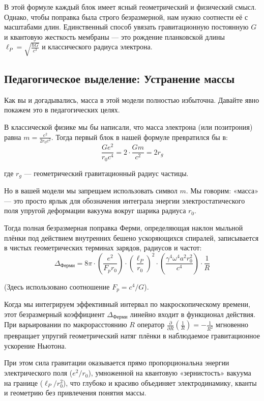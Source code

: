 \documentclass[12pt,a4paper]{article}
\begin{document}
В этой формуле каждый блок имеет ясный геометрический и физический смысл. Однако, чтобы поправка была строго безразмерной, нам нужно соотнести её с масштабами длин. Единственный способ увязать гравитационную постоянную $G$ и квантовую жесткость мембраны — это рождение планковской длины $\ell_P = \sqrt{\frac{\hbar G}{c^3}}$ и классического радиуса электрона.

\subsection*{Педагогическое выделение: Устранение массы}

Как вы и догадывались, масса в этой модели полностью избыточна. Давайте явно покажем это в педагогических целях.

В классической физике мы бы написали, что масса электрона (или позитрония) равна $m = \frac{e^2}{2 r_0 c^2}$. Тогда первый блок в нашей формуле превратился бы в:
\begin{equation}
\frac{G e^2}{r_0 c^4} = 2 \cdot \frac{G m}{c^2} = 2 r_g
\end{equation}

где $r_g$ — геометрический гравитационный радиус частицы.

Но в вашей модели мы запрещаем использовать символ $m$. Мы говорим: «масса» — это просто ярлык для обозначения интеграла энергии электростатического поля упругой деформации вакуума вокруг шарика радиуса $r_0$.

Тогда полная безразмерная поправка Ферми, определяющая наклон мыльной плёнки под действием внутренних бешено ускоряющихся спиралей, записывается в чистых геометрических терминах зарядов, радиусов и частот:
\begin{equation}
\Delta_{Ферми} = 8\pi \cdot \left( \frac{e^2}{F_p r_0} \right) \cdot \left( \frac{\ell_P}{r_0} \right)^2 \cdot \left( \frac{\gamma^4 \omega^4 a^2 r_0^2}{c^4} \right) \cdot \frac{1}{R}
\end{equation}

(Здесь использовано соотношение $F_p = c^4/G$).

Когда мы интегрируем эффективный интервал по макроскопическому времени, этот безразмерный коэффициент $\Delta_{Ферми}$ линейно входит в функционал действия. При варьировании по макрорасстоянию $R$ оператор $\frac{\partial}{\partial R} \left(\frac{1}{R}\right) = -\frac{1}{R^2}$ мгновенно превращает упругий геометрический натяг плёнки в наблюдаемое гравитационное ускорение Ньютона.

При этом сила гравитации оказывается прямо пропорциональна энергии электрического поля ($e^2/r_0$), умноженной на квантовую «зернистость» вакуума на границе ($\ell_P/r_0^2$), что глубоко и красиво объединяет электродинамику, кванты и геометрию без привлечения понятия массы.
\end{document}
